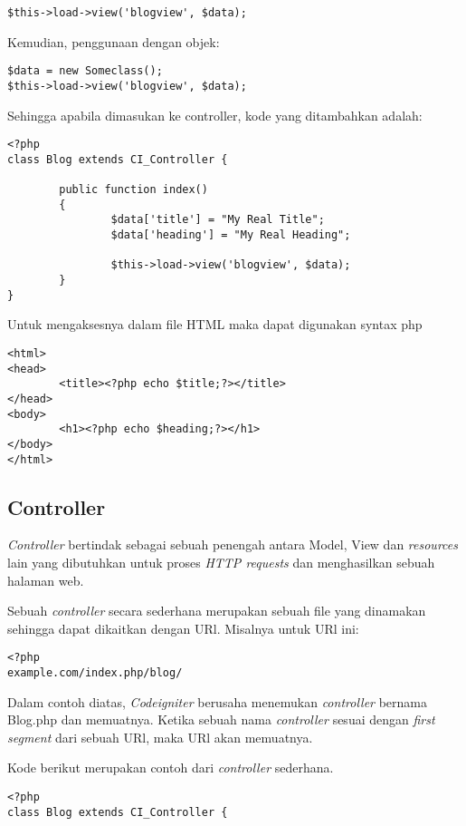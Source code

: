 \begin{enumerate}
\begin{lstlisting}[label=phpheg, frame=single]
$this->load->view('blogview', $data);
\end{lstlisting}

Kemudian, penggunaan dengan objek:
\begin{lstlisting}[label=phpheg, frame=single] 
$data = new Someclass();
$this->load->view('blogview', $data);
\end{lstlisting}

Sehingga apabila dimasukan ke controller, kode yang ditambahkan adalah:
\begin{lstlisting}[label=phpheg, frame=single] 
<?php
class Blog extends CI_Controller {

        public function index()
        {
                $data['title'] = "My Real Title";
                $data['heading'] = "My Real Heading";

                $this->load->view('blogview', $data);
        }
}
\end{lstlisting}

Untuk mengaksesnya dalam file HTML maka dapat digunakan syntax php
\begin{lstlisting}[frame=single] 
<html>
<head>
        <title><?php echo $title;?></title>
</head>
<body>
        <h1><?php echo $heading;?></h1>
</body>
</html>
\end{lstlisting}

\subsection{Controller}
\label{subs:controller}
\textit{Controller} bertindak sebagai sebuah penengah antara Model, View dan \textit{resources} lain yang dibutuhkan untuk proses \textit{HTTP requests} dan menghasilkan sebuah halaman web.

Sebuah \textit{controller} secara sederhana merupakan sebuah file yang dinamakan sehingga dapat dikaitkan dengan URl.\cite{codeigniter:17}
Misalnya untuk URl ini:
\begin{lstlisting}[label=phpheg, frame=single] 
<?php
example.com/index.php/blog/
\end{lstlisting}

Dalam contoh diatas, \textit{Codeigniter} berusaha menemukan \textit{controller} bernama Blog.php dan memuatnya. Ketika sebuah nama \textit{controller} sesuai dengan \textit{first segment} dari sebuah URl, maka URl akan memuatnya.\cite{codeigniter:17}

Kode berikut merupakan contoh dari \textit{controller} sederhana.
\begin{lstlisting}[label=phpheg, frame=single] 
<?php
class Blog extends CI_Controller {


\end{lstlisting}
\end{enumerate}
